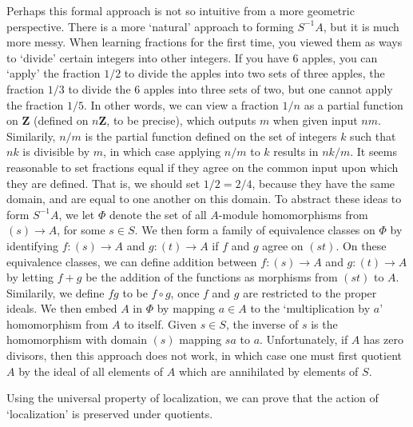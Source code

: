 Perhaps this formal approach is not so intuitive from a more geometric perspective. There is a more `natural' approach to forming $S^{-1}A$, but it is much more messy. When learning fractions for the first time, you viewed them as ways to `divide' certain integers into other integers. If you have 6 apples, you can `apply' the fraction $1/2$ to divide the apples into two sets of three apples, the fraction $1/3$ to divide the 6 apples into three sets of two, but one cannot apply the fraction $1/5$. In other words, we can view a fraction $1/n$ as a partial function on $\mathbf{Z}$ (defined on $n \mathbf{Z}$, to be precise), which outputs $m$ when given input $nm$. Similarily, $n/m$ is the partial function defined on the set of integers $k$ such that $nk$ is divisible by $m$, in which case applying $n/m$ to $k$ results in $nk/m$. It seems reasonable to set fractions equal if they agree on the common input upon which they are defined. That is, we should set $1/2 = 2/4$, because they have the same domain, and are equal to one another on this domain. To abstract these ideas to form $S^{-1}A$, we let $\Phi$ denote the set of all $A$-module homomorphisms from $(s) \to A$, for some $s \in S$. We then form a family of equivalence classes on $\Phi$ by identifying $f: (s) \to A$ and $g: (t) \to A$ if $f$ and $g$ agree on $(st)$. On these equivalence classes, we can define addition between $f: (s) \to A$ and $g: (t) \to A$ by letting $f + g$ be the addition of the functions as morphisms from $(st)$ to $A$. Similarily, we define $fg$ to be $f \circ g$, once $f$ and $g$ are restricted to the proper ideals. We then embed $A$ in $\Phi$ by mapping $a \in A$ to the `multiplication by $a$' homomorphism from $A$ to itself. Given $s \in S$, the inverse of $s$ is the homomorphism with domain $(s)$ mapping $sa$ to $a$. Unfortunately, if $A$ has zero divisors, then this approach does not work, in which case one must first quotient $A$ by the ideal of all elements of $A$ which are annihilated by elements of $S$.

Using the universal property of localization, we can prove that the action of `localization' is preserved under quotients.


